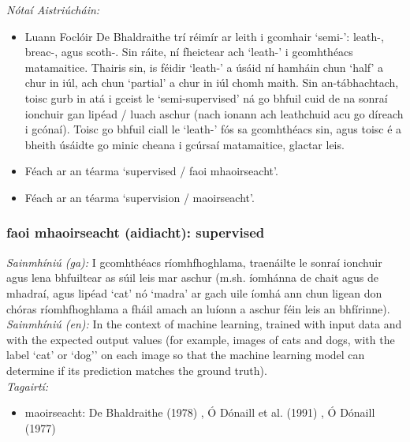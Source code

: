  \noindent \textit{Nótaí Aistriúcháin:}
\begin{itemize}
	\item Luann Foclóir De Bhaldraithe trí réimír ar leith i gcomhair `semi-': leath-, breac-, agus scoth-. Sin ráite, ní fheictear ach `leath-' i gcomhthéacs matamaitice. Thairis sin, is féidir `leath-' a úsáid ní hamháin chun `half' a chur in iúl, ach chun `partial' a chur in iúl chomh maith. Sin an-tábhachtach, toisc gurb in atá i gceist le `semi-supervised' ná go bhfuil cuid de na sonraí ionchuir gan lipéad / luach aschur (nach ionann ach leathchuid acu go díreach i gcónaí). Toisc go bhfuil ciall le `leath-' fós sa gcomhthéacs sin, agus toisc é a bheith úsáidte go minic cheana i gcúrsaí matamaitice, glactar leis.
	\item Féach ar an téarma `supervised / faoi mhaoirseacht'.
	\item Féach ar an téarma `supervision / maoirseacht'.
\end{itemize}


\subsubsection*{faoi mhaoirseacht (aidiacht): supervised}
 \noindent \textit{Sainmhíniú (ga):} I gcomhthéacs ríomhfhoghlama, traenáilte le sonraí ionchuir agus lena bhfuiltear as súil leis mar aschur (m.sh. íomhánna de chait agus de mhadraí, agus lipéad `cat' nó `madra' ar gach uile íomhá ann chun ligean don chóras ríomhfhoghlama a fháil amach an luíonn a aschur féin leis an bhfírinne).
\\
 \noindent \textit{Sainmhíniú (en):} In the context of machine learning, trained with input data and with the expected output values (for example, images of cats and dogs, with the label `cat' or `dog'' on each image so that the machine learning model can determine if its prediction matches the ground truth).
\\
 \noindent \textit{Tagairtí:}
\begin{itemize}
	\item maoirseacht: De Bhaldraithe (1978) \cite{de-bhaldraithe}, Ó Dónaill et al. (1991) \cite{focloir-beag}, Ó Dónaill (1977) \cite{odonaill}
\end{itemize}

